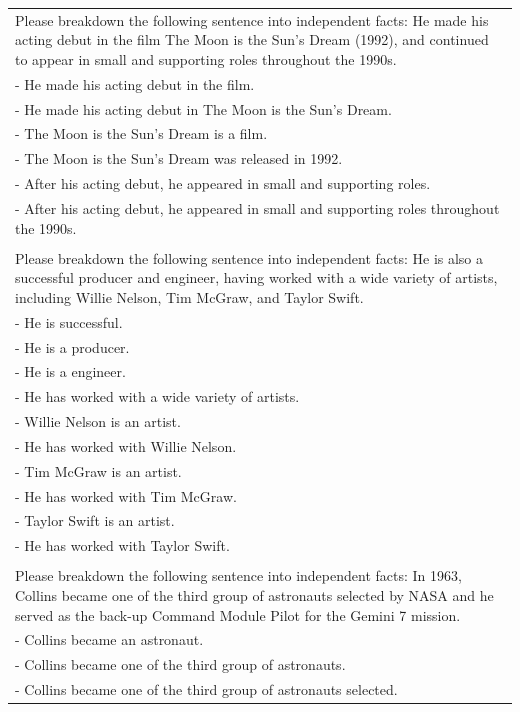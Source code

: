 \documentclass[11pt]{article}
\begin{document}
\begin{table}[t]
    \scriptsize \centering
    \begin{tabular}{|p{}|}
        \toprule
Please breakdown the following sentence into independent facts: He made his acting debut in the film The Moon is the Sun's Dream (1992), and continued to appear in small and supporting roles throughout the 1990s. \\
- He made his acting debut in the film. \\
- He made his acting debut in The Moon is the Sun's Dream. \\
- The Moon is the Sun's Dream is a film. \\
- The Moon is the Sun's Dream was released in 1992.\\
- After his acting debut, he appeared in small and supporting roles.\\
- After his acting debut, he appeared in small and supporting roles throughout the 1990s.\\
\\
Please breakdown the following sentence into independent facts: He is also a successful producer and engineer, having worked with a wide variety of artists, including Willie Nelson, Tim McGraw, and Taylor Swift.\\
- He is successful.\\
- He is a producer.\\
- He is a engineer.\\
- He has worked with a wide variety of artists.\\
- Willie Nelson is an artist.\\
- He has worked with Willie Nelson.\\
- Tim McGraw is an artist.\\
- He has worked with Tim McGraw.\\
- Taylor Swift is an artist.\\
- He has worked with Taylor Swift.\\
\\
Please breakdown the following sentence into independent facts: In 1963, Collins became one of the third group of astronauts selected by NASA and he served as the back-up Command Module Pilot for the Gemini 7 mission.\\
- Collins became an astronaut.\\
- Collins became one of the third group of astronauts.\\
- Collins became one of the third group of astronauts selected.\\

\end{tabular}
\end{table}
\end{document}

